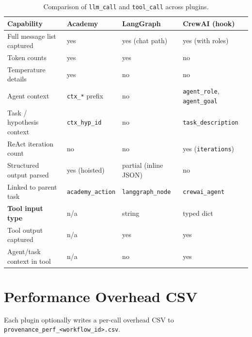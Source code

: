 \documentclass[11pt,a4paper]{article}
\newcommand{\subtype}[1]{\texttt{\textcolor{subtypeblue}{#1}}}
\begin{document}
\begin{table}[h!]
\centering
\small
\begin{tabularx}{\textwidth}{L{4.5cm} C{2cm} C{2.5cm} C{2.5cm}}
\toprule
\textbf{Capability}
  & \textbf{Academy}
  & \textbf{LangGraph}
  & \textbf{CrewAI (hook)} \\
\midrule
Full message list captured  & yes & yes (chat path) & yes (with roles) \\
Token counts                & yes & yes             & no \\
Temperature details         & yes & no              & no \\
Agent context               & \texttt{ctx\_*} prefix & no & \texttt{agent\_role}, \texttt{agent\_goal} \\
Task / hypothesis context   & \texttt{ctx\_hyp\_id}  & no & \texttt{task\_description} \\
ReAct iteration count       & no  & no              & yes (\texttt{iterations}) \\
Structured output parsed    & yes (hoisted) & partial (inline JSON) & no \\
Linked to parent task       & \subtype{academy\_action} & \subtype{langgraph\_node} & \subtype{crewai\_agent} \\
\midrule
\textbf{Tool input type}    & n/a & string          & typed dict \\
Tool output captured        & n/a & yes             & yes \\
Agent/task context in tool  & n/a & no              & yes \\
\bottomrule
\end{tabularx}
\caption{Comparison of \subtype{llm\_call} and \subtype{tool\_call} across plugins.}
\label{tab:comparison}
\end{table}

\section{Performance Overhead CSV}

Each plugin optionally writes a per-call overhead CSV to
\texttt{provenance\_perf\_<workflow\_id>.csv}.
\end{document}
